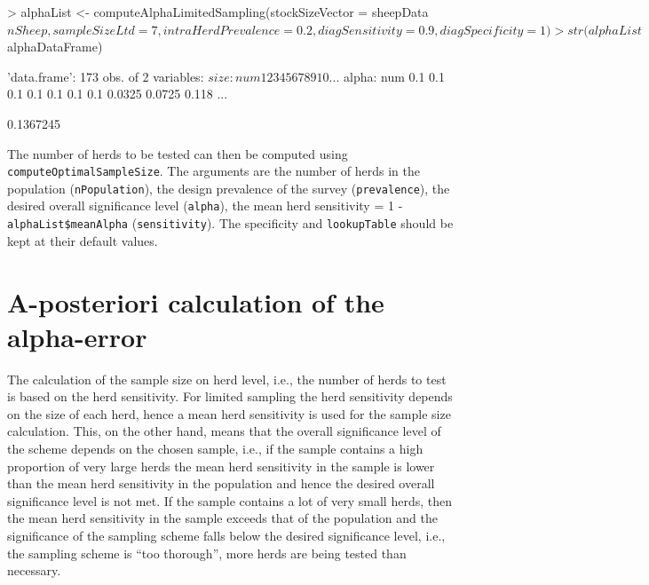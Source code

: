 \documentclass[nojss]{jss}
\begin{document}
\begin{Schunk}
\begin{Sinput}
> alphaList <- computeAlphaLimitedSampling(stockSizeVector = sheepData$nSheep, 
       sampleSizeLtd = 7, intraHerdPrevalence = 0.2, diagSensitivity = 0.9, 
       diagSpecificity = 1)
> str(alphaList$alphaDataFrame) 
\end{Sinput}
\begin{Soutput}
'data.frame':	173 obs. of  2 variables:
 $ size : num  1 2 3 4 5 6 7 8 9 10 ...
 $ alpha: num  0.1 0.1 0.1 0.1 0.1 0.1 0.1 0.0325 0.0725 0.118 ...
\end{Soutput}
\begin{Soutput}
[1] 0.1367245
\end{Soutput}
\end{Schunk}

The number of herds to be tested can then be computed using 
\texttt{computeOptimalSampleSize}. The arguments are the number of 
herds in the population (\texttt{nPopulation}), the design 
prevalence of the survey (\texttt{prevalence}), the desired overall 
significance level (\texttt{alpha}), the mean herd sensitivity = 1 - 
\texttt{alphaList\$meanAlpha} (\texttt{sensitivity}). The specificity and 
\texttt{lookupTable} should be kept at their default values.


%
%

\section{A-posteriori calculation of the alpha-error}
\label{sec:aposteriori}

The calculation of the sample size on herd level, i.e., the number 
of herds to test is based on the herd sensitivity. For limited 
sampling the herd sensitivity depends on the size of each herd, 
hence a mean herd sensitivity is used for the sample size 
calculation. This, on the other hand, means that the overall 
significance level of the scheme depends on the chosen sample, i.e., 
if the sample contains a high proportion of very large herds the 
mean herd sensitivity in the sample is lower than the mean herd 
sensitivity in the population and hence the desired overall 
significance level is not met. If the sample contains a lot of very 
small herds, then the mean herd sensitivity in the sample exceeds 
that of the population and the significance of the sampling scheme 
falls below the desired significance level, i.e., the sampling 
scheme is ``too thorough'', more herds are being tested than 
necessary. 
\end{document}
